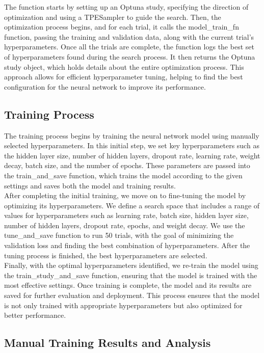  The function starts by setting up an Optuna study, specifying the direction of optimization and using a TPESampler to guide the search. Then, the optimization process begins, and for each trial, it calls the model\_train\_fn function, passing the training and validation data, along with the current trial's hyperparameters. Once all the trials are complete, the function logs the best set of hyperparameters found during the search process. It then returns the Optuna study object, which holds details about the entire optimization process. This approach allows for efficient hyperparameter tuning, helping to find the best configuration for the neural network to improve its performance.

\subsection{Training Process}
The training process begins by training the neural network model using manually selected hyperparameters. In this initial step, we set key hyperparameters such as the hidden layer size, number of hidden layers, dropout rate, learning rate, weight decay, batch size, and the number of epochs. These parameters are passed into the train\_and\_save function, which trains the model according to the given settings and saves both the model and training results.\\

After completing the initial training, we move on to fine-tuning the model by optimizing its hyperparameters. We define a search space that includes a range of values for hyperparameters such as learning rate, batch size, hidden layer size, number of hidden layers, dropout rate, epochs, and weight decay. We use the tune\_and\_save function to run 50 trials, with the goal of minimizing the validation loss and finding the best combination of hyperparameters. After the tuning process is finished, the best hyperparameters are selected.\\

Finally, with the optimal hyperparameters identified, we re-train the model using the train\_study\_and\_save function, ensuring that the model is trained with the most effective settings. Once training is complete, the model and its results are saved for further evaluation and deployment. This process ensures that the model is not only trained with appropriate hyperparameters but also optimized for better performance.

\subsection{Manual Training Results and Analysis}

